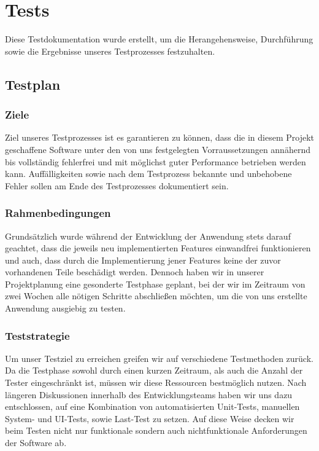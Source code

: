 \chapter{Tests}
Diese Testdokumentation wurde erstellt, um die Herangehensweise, Durchführung sowie die Ergebnisse unseres Testprozesses festzuhalten.

\section{Testplan}

\subsection{Ziele}
Ziel unseres Testprozesses ist es garantieren zu können, dass die in diesem Projekt geschaffene Software unter den von uns festgelegten Vorraussetzungen annähernd bis vollständig fehlerfrei und mit möglichst guter Performance betrieben werden kann. Auffälligkeiten sowie nach dem Testprozess bekannte und unbehobene Fehler sollen am Ende des Testprozesses dokumentiert sein.

\subsection{Rahmenbedingungen}
Grundsätzlich wurde während der Entwicklung der Anwendung stets darauf geachtet, dass die jeweils neu implementierten Features einwandfrei funktionieren und auch, dass durch die Implementierung jener Features keine der zuvor vorhandenen Teile beschädigt werden. Dennoch haben wir in unserer Projektplanung eine gesonderte Testphase geplant, bei der wir im Zeitraum von zwei Wochen alle nötigen Schritte abschließen möchten, um die von uns erstellte Anwendung ausgiebig zu testen.



 

\subsection{Teststrategie}
Um unser Testziel zu erreichen greifen wir auf verschiedene Testmethoden zurück. Da die Testphase sowohl durch einen kurzen Zeitraum, als auch die Anzahl der Tester eingeschränkt ist, müssen wir diese Ressourcen bestmöglich nutzen. Nach längeren Diskussionen innerhalb des Entwicklungsteams haben wir uns dazu entschlossen, auf eine Kombination von automatisierten Unit-Tests, manuellen System- und UI-Tests, sowie Last-Test zu setzen. Auf diese Weise decken wir beim Testen nicht nur funktionale sondern auch nichtfunktionale Anforderungen der Software ab.

